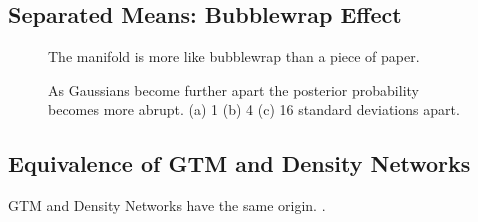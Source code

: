 \subsection{Separated Means: Bubblewrap Effect}

% 
\begin{figure}


  \begin{centering}
    \hfill{}
    \par\end{centering}

  \caption{The manifold is more like bubblewrap than a piece of paper.}



\end{figure}



% 
\begin{figure}
  \begin{centering}
    \par\end{centering}

  \begin{centering}
    \par\end{centering}

  \begin{centering}
    \par\end{centering}

  \caption{As Gaussians become further apart the posterior probability becomes
    more abrupt. (a) 1 (b) 4 (c) 16 standard deviations apart. }

\end{figure}


\subsection{Equivalence of GTM and Density Networks}

GTM and Density Networks have the same origin. \cite{Bishop:emdn95,MacKay:wondsa95}.

